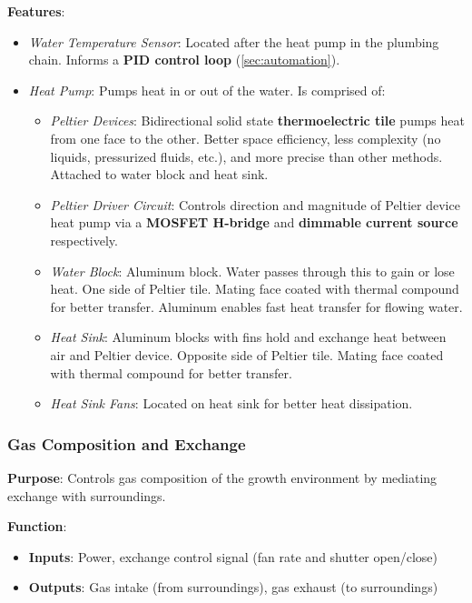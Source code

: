 \documentclass{../tex/report}
\begin{document}
\textbf{Features}:
\begin{itemize}
    \item \textit{Water Temperature Sensor}: Located after the heat pump in the plumbing chain. Informs a \textbf{PID control loop} (\ref{sec:automation}).
    \item \textit{Heat Pump}: Pumps heat in or out of the water. Is comprised of:
    \begin{itemize}
        \item \textit{Peltier Devices}: Bidirectional solid state \textbf{thermoelectric tile} pumps heat from one face to the other. Better space efficiency, less complexity (no liquids, pressurized fluids, etc.), and more precise than other methods. Attached to water block and heat sink.
        \item \textit{Peltier Driver Circuit}: Controls direction and magnitude of Peltier device heat pump via a \textbf{MOSFET H-bridge} and \textbf{dimmable current source} respectively.
        \item \textit{Water Block}: Aluminum block. Water passes through this to gain or lose heat. One side of Peltier tile. Mating face coated with thermal compound for better transfer. Aluminum enables fast heat transfer for flowing water.
        \item \textit{Heat Sink}: Aluminum blocks with fins hold and exchange heat between air and Peltier device. Opposite side of Peltier tile. Mating face coated with thermal compound for better transfer.
        \item \textit{Heat Sink Fans}: Located on heat sink for better heat dissipation.
    \end{itemize}
\end{itemize}

\newpage

\subsubsection{Gas Composition and Exchange}
\label{sec:gas}

\textbf{Purpose}: Controls gas composition of the growth environment by mediating exchange with surroundings.

\textbf{Function}:
\begin{itemize}
    \item \textbf{Inputs}: Power, exchange control signal (fan rate and shutter open/close)
    \item \textbf{Outputs}: Gas intake (from surroundings), gas exhaust (to surroundings)
\end{itemize}
\end{document}
